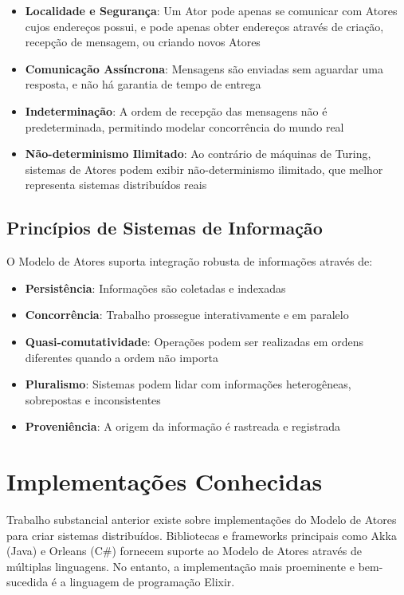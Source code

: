 \begin{itemize}
    \item \textbf{Localidade e Segurança}: Um Ator pode apenas se comunicar com Atores cujos endereços possui, e pode apenas obter endereços através de criação, recepção de mensagem, ou criando novos Atores
    \item \textbf{Comunicação Assíncrona}: Mensagens são enviadas sem aguardar uma resposta, e não há garantia de tempo de entrega
    \item \textbf{Indeterminação}: A ordem de recepção das mensagens não é predeterminada, permitindo modelar concorrência do mundo real
    \item \textbf{Não-determinismo Ilimitado}: Ao contrário de máquinas de Turing, sistemas de Atores podem exibir não-determinismo ilimitado, que melhor representa sistemas distribuídos reais
\end{itemize}

\subsection{Princípios de Sistemas de Informação}

O Modelo de Atores suporta integração robusta de informações através de:

\begin{itemize}
    \item \textbf{Persistência}: Informações são coletadas e indexadas
    \item \textbf{Concorrência}: Trabalho prossegue interativamente e em paralelo
    \item \textbf{Quasi-comutatividade}: Operações podem ser realizadas em ordens diferentes quando a ordem não importa
    \item \textbf{Pluralismo}: Sistemas podem lidar com informações heterogêneas, sobrepostas e inconsistentes
    \item \textbf{Proveniência}: A origem da informação é rastreada e registrada
\end{itemize}

\section{Implementações Conhecidas}

Trabalho substancial anterior existe sobre implementações do Modelo de Atores para criar sistemas distribuídos. Bibliotecas e frameworks principais como Akka (Java) e Orleans (C\#) fornecem suporte ao Modelo de Atores através de múltiplas linguagens. No entanto, a implementação mais proeminente e bem-sucedida é a linguagem de programação Elixir.

